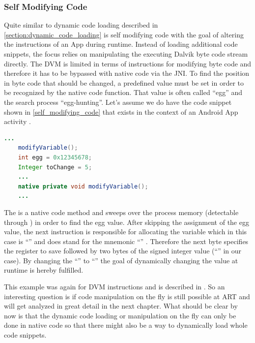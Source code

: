 \subsubsection{Self Modifying Code}
Quite similar to dynamic code loading described in
\autoref{section:dynamic_code_loading} is self modifying code with the goal
of altering the instructions of an App during runtime.
Instead of loading additional code snippets, the focus relies on
manipulating the executing Dalvik byte code stream directly.
The DVM is limited in terms of instructions for modifying byte code
and therefore it has to be bypassed with native code via the JNI.
To find the position in byte code that should be changed, a predefined
value must be set in order to be recognized by the native code function.
That value is often called ``egg'' and the search process ``egg-hunting''.
Let's assume we do have the code snippet shown in \autoref{self_modifying_code} that exists in the context of an Android App activity
\parencite{code_protection}.
 \begin{lstlisting}[language=Java, caption=Self Modifying Code Example, label=self_modifying_code]
    ...
    modifyVariable();
    int egg = 0x12345678;
    Integer toChange = 5;
    ...
    native private void modifyVariable();
    ...
\end{lstlisting}

The  is a native code method and sweeps
over the process memory (detectable through )
in order to find the egg value. After skipping the assignment of
the egg value, the next instruction is responsible for allocating
the  variable which in this case is ``''
and does stand for the mnemonic ``''
\parencite{bytecode_format}. Therefore the next byte specifies the
register to save followed by two bytes of the signed integer value
(``'' in our case). By changing the ``'' to
``'' the goal of dynamically changing the value at runtime
is hereby fulfilled.

This example was again for DVM instructions and is described in \parencite{code_protection}. So an interesting question is if code manipulation on the fly
is still possible at ART and will get analyzed in great detail in the next chapter.
What should be clear by now is that the dynamic code loading or manipulation on the
fly can only be done in native code so that there might also be a way to dynamically
load whole code snippets.
